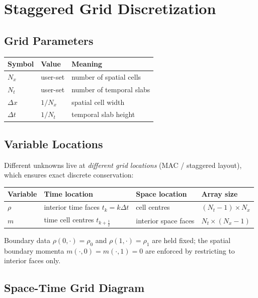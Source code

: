 \documentclass[11pt]{article}
\newcommand{\rhoO}{\rho_0}
\newcommand{\rhoT}{\rho_1}
\begin{document}
\section{Staggered Grid Discretization}\label{sec:disc}

\subsection{Grid Parameters}

\begin{center}
\begin{tabular}{lll}
\toprule
Symbol & Value & Meaning\\
\midrule
$N_x$ & user-set & number of spatial cells\\
$N_t$ & user-set & number of temporal slabs\\
$\Delta x$ & $1/N_x$ & spatial cell width\\
$\Delta t$ & $1/N_t$ & temporal slab height\\
\bottomrule
\end{tabular}
\end{center}

\subsection{Variable Locations}

Different unknowns live at \emph{different grid locations}
(MAC / staggered layout), which ensures exact discrete conservation:

\begin{center}
\begin{tabular}{llll}
\toprule
Variable & Time location & Space location & Array size\\
\midrule
$\rho$ & interior time faces $t_k = k\Delta t$ & cell centres & $(N_t-1)\times N_x$\\
$m$ & time cell centres $t_{k+\frac{1}{2}}$ & interior space faces & $N_t\times(N_x-1)$\\
\bottomrule
\end{tabular}
\end{center}

Boundary data $\rho(0,\cdot)=\rhoO$ and $\rho(1,\cdot)=\rhoT$ are held
fixed; the spatial boundary momenta $m(\cdot,0)=m(\cdot,1)=0$ are enforced
by restricting to interior faces only.

\subsection{Space-Time Grid Diagram}
\end{document}
